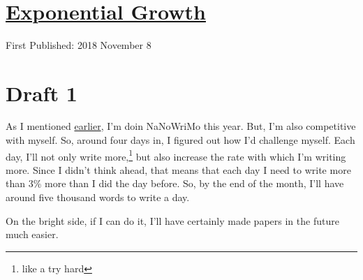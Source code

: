 \documentclass[12pt]{article}[titlepage]
\newcommand{\1}{\={a}}
\newcommand{\2}{\={e}}
\newcommand{\3}{\={\i}}
\newcommand{\4}{\=o}
\newcommand{\5}{\=u}
\newcommand{\6}{\={A}}
\renewcommand{\,}{\textsuperscript{,}}
\begin{document}

\doublespacing
\section{\href{exponential-growth.html}{Exponential Growth}}
First Published: 2018 November 8
\section{Draft 1}
As I mentioned \href{nanowrimo.html}{earlier}, I'm doin NaNoWriMo this year.
But, I'm also competitive with myself.
So, around four days in, I figured out how I'd challenge myself.
Each day, I'll not only write more,\footnote{like a try hard} but also increase the rate with which I'm writing more.
Since I didn't think ahead, that means that each day I need to write more than 3\% more than I did the day before.
So, by the end of the month, I'll have around five thousand words to write a day.

On the bright side, if I can do it, I'll have certainly made papers in the future much easier.
\end{document}
